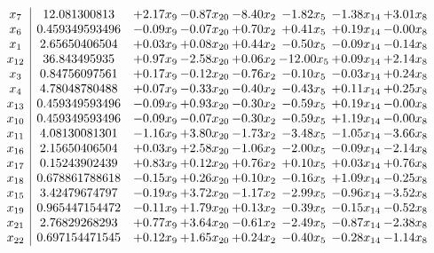 \documentclass[8pt]{article}
\begin{document}
\[\begin{array}{c| c c@{\hskip 2pt} c@{\hskip 2pt} c@{\hskip 2pt} c@{\hskip 2pt} c@{\hskip 2pt} c@{\hskip 2pt} }
 x_{7}   &  12.081300813 & +  2.17 x_{9} & -0.87 x_{20} & -8.40 x_{2} & -1.82 x_{5} & -1.38 x_{14} & +  3.01 x_{8}\\
 x_{6}   &  0.459349593496 & -0.09 x_{9} & -0.07 x_{20} & +  0.70 x_{2} & +  0.41 x_{5} & +  0.19 x_{14} & -0.00 x_{8}\\
 x_{1}   &  2.65650406504 & +  0.03 x_{9} & +  0.08 x_{20} & +  0.44 x_{2} & -0.50 x_{5} & -0.09 x_{14} & -0.14 x_{8}\\
 x_{12}   &  36.843495935 & +  0.97 x_{9} & -2.58 x_{20} & +  0.06 x_{2} & -12.00 x_{5} & +  0.09 x_{14} & +  2.14 x_{8}\\
 x_{3}   &  0.84756097561 & +  0.17 x_{9} & -0.12 x_{20} & -0.76 x_{2} & -0.10 x_{5} & -0.03 x_{14} & +  0.24 x_{8}\\
 x_{4}   &  4.78048780488 & +  0.07 x_{9} & -0.33 x_{20} & -0.40 x_{2} & -0.43 x_{5} & +  0.11 x_{14} & +  0.25 x_{8}\\
 x_{13}   &  0.459349593496 & -0.09 x_{9} & +  0.93 x_{20} & -0.30 x_{2} & -0.59 x_{5} & +  0.19 x_{14} & -0.00 x_{8}\\
 x_{10}   &  0.459349593496 & -0.09 x_{9} & -0.07 x_{20} & -0.30 x_{2} & -0.59 x_{5} & +  1.19 x_{14} & -0.00 x_{8}\\
 x_{11}   &  4.08130081301 & -1.16 x_{9} & +  3.80 x_{20} & -1.73 x_{2} & -3.48 x_{5} & -1.05 x_{14} & -3.66 x_{8}\\
 x_{16}   &  2.15650406504 & +  0.03 x_{9} & +  2.58 x_{20} & -1.06 x_{2} & -2.00 x_{5} & -0.09 x_{14} & -2.14 x_{8}\\
 x_{17}   &  0.15243902439 & +  0.83 x_{9} & +  0.12 x_{20} & +  0.76 x_{2} & +  0.10 x_{5} & +  0.03 x_{14} & +  0.76 x_{8}\\
 x_{18}   &  0.678861788618 & -0.15 x_{9} & +  0.26 x_{20} & +  0.10 x_{2} & -0.16 x_{5} & +  1.09 x_{14} & -0.25 x_{8}\\
 x_{15}   &  3.42479674797 & -0.19 x_{9} & +  3.72 x_{20} & -1.17 x_{2} & -2.99 x_{5} & -0.96 x_{14} & -3.52 x_{8}\\
 x_{19}   &  0.965447154472 & -0.11 x_{9} & +  1.79 x_{20} & +  0.13 x_{2} & -0.39 x_{5} & -0.15 x_{14} & -0.52 x_{8}\\
 x_{21}   &  2.76829268293 & +  0.77 x_{9} & +  3.64 x_{20} & -0.61 x_{2} & -2.49 x_{5} & -0.87 x_{14} & -2.38 x_{8}\\
 x_{22}   &  0.697154471545 & +  0.12 x_{9} & +  1.65 x_{20} & +  0.24 x_{2} & -0.40 x_{5} & -0.28 x_{14} & -1.14 x_{8}\\

\end{array}\]
\end{document}
